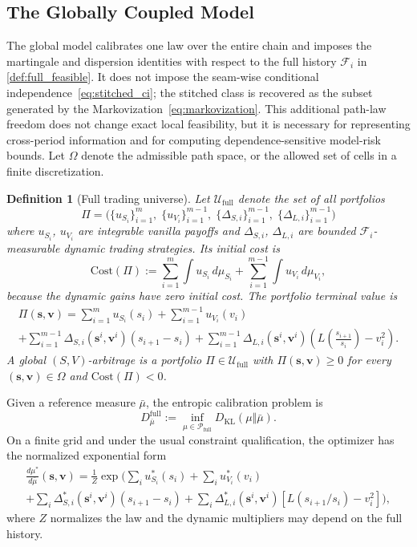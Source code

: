 \documentclass{article}
\newtheorem{definition}{Definition}[section]
\newcommand{\cF}{\mathcal{F}}
\newcommand{\cP}{\mathcal{P}}
\newcommand{\cU}{\mathcal{U}}
\newcommand{\bs}{\mathbf{s}}
\newcommand{\bv}{\mathbf{v}}
\begin{document}
\subsection{The Globally Coupled Model}\label{subsec:global_model}

The global model calibrates one law over the entire chain and imposes the martingale and dispersion identities with respect to the full history $\cF_i$ in \cref{def:full_feasible}.
It does not impose the seam-wise conditional independence~\eqref{eq:stitched_ci}; the stitched class is recovered as the subset generated by the Markovization~\eqref{eq:markovization}.
This additional path-law freedom does not change exact local feasibility, but it is necessary for representing cross-period information and for computing dependence-sensitive model-risk bounds.
Let $\Omega$ denote the admissible path space, or the allowed set of cells in a finite discretization.

\begin{definition}[Full trading universe]\label{def:full_trading}
Let $\cU_{\mathrm{full}}$ denote the set of all portfolios
\[
\Pi = \bigl(\{u_{S_i}\}_{i=1}^{m},\; \{u_{V_i}\}_{i=1}^{m-1},\; \{\Delta_{S,i}\}_{i=1}^{m-1},\; \{\Delta_{L,i}\}_{i=1}^{m-1}\bigr)
\]
where $u_{S_i}$, $u_{V_i}$ are integrable vanilla payoffs and $\Delta_{S,i}$, $\Delta_{L,i}$ are bounded $\cF_i$-measurable dynamic trading strategies.
Its initial cost is
\[
\mathrm{Cost}(\Pi)
:=
\sum_{i=1}^{m}\int u_{S_i}\,d\mu_{S_i}
+\sum_{i=1}^{m-1}\int u_{V_i}\,d\mu_{V_i},
\]
because the dynamic gains have zero initial cost.
The portfolio terminal value is
\begin{multline}\label{eq:portfolio_value}
    \Pi(\bs, \bv) = \sum_{i=1}^{m} u_{S_i}(s_i) + \sum_{i=1}^{m-1} u_{V_i}(v_i) \\
    + \sum_{i=1}^{m-1} \Delta_{S,i}(\bs^i, \bv^i)(s_{i+1} - s_i) + \sum_{i=1}^{m-1} \Delta_{L,i}(\bs^i, \bv^i)\!\left(L\!\left(\frac{s_{i+1}}{s_i}\right) - v_i^2\right).
\end{multline}
A \emph{global $(S,V)$-arbitrage} is a portfolio $\Pi \in \cU_{\mathrm{full}}$ with $\Pi(\bs,\bv) \geq 0$ for every $(\bs,\bv)\in\Omega$ and $\mathrm{Cost}(\Pi) < 0$.
\end{definition}

Given a reference measure $\bar{\mu}$, the entropic calibration problem is
\begin{equation}\label{eq:entropic_full}
    D_{\bar{\mu}}^{\mathrm{full}} := \inf_{\mu \in \cP_{\mathrm{full}}}D_{\mathrm{KL}}(\mu\Vert\bar{\mu}).
\end{equation}
On a finite grid and under the usual constraint qualification, the optimizer has the normalized exponential form
\begin{multline}
\frac{d\mu^*}{d\bar\mu}(\bs,\bv)
=\frac{1}{Z}\exp\!\Biggl(
\sum_i u^*_{S_i}(s_i)+\sum_i u^*_{V_i}(v_i)\\
+\sum_i\Delta^*_{S,i}(\bs^i,\bv^i)(s_{i+1}-s_i)
+\sum_i\Delta^*_{L,i}(\bs^i,\bv^i)
\left[L(s_{i+1}/s_i)-v_i^2\right]
\Biggr),
\end{multline}
where $Z$ normalizes the law and the dynamic multipliers may depend on the full history.
\end{document}
